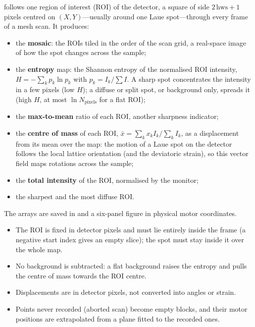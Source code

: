  follows one
region of interest (ROI) of the detector, a square of side $2\,\mathrm{hws}+1$ pixels centred
on $(X, Y)$---usually around one Laue spot---through every frame of a mesh scan. It produces:
\begin{itemize}[nosep]
\item the \textbf{mosaic}: the ROIs tiled in the order of the scan grid, a real-space image of
  how the spot changes across the sample;
\item the \textbf{entropy} map: the Shannon entropy \citep{Shannon1948} of the normalised ROI
  intensity, $H = -\sum_k p_k\ln p_k$ with $p_k = I_k/\sum I$. A sharp spot concentrates the
  intensity in a few pixels (low $H$); a diffuse or split spot, or background only, spreads it
  (high $H$, at most $\ln N_\mathrm{pixels}$ for a flat ROI);
\item the \textbf{max-to-mean} ratio of each ROI, another sharpness indicator;
\item the \textbf{centre of mass} of each ROI, $\bar x = \sum_k x_kI_k/\sum_k I_k$, as a
  displacement from its mean over the map: the motion of a Laue spot on the detector follows
  the local lattice orientation (and the deviatoric strain), so this vector field maps
  rotations across the sample;
\item the \textbf{total intensity} of the ROI, normalised by the monitor;
\item the sharpest and the most diffuse ROI.
\end{itemize}
The arrays are saved in  and a six-panel figure in physical
motor coordinates.

\begin{hyp}
\begin{itemize}[nosep,leftmargin=1em]
\item The ROI is fixed in detector pixels and must lie entirely inside the frame (a negative
  start index gives an empty slice); the spot must stay inside it over the whole map.
\item No background is subtracted: a flat background raises the entropy and pulls the centre
  of mass towards the ROI centre.
\item Displacements are in detector pixels, not converted into angles or strain.
\item Points never recorded (aborted scan) become empty blocks, and their motor positions
  are extrapolated from a plane fitted to the recorded ones.
\end{itemize}
\end{hyp}

